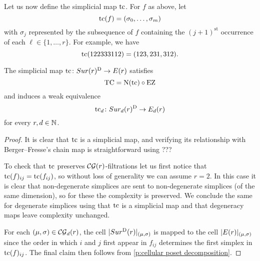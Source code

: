 Let us now define the simplicial map $\operatorname{tc}$.
For $f$ as above, let
\[
\operatorname{tc}(f) = (\sigma_0,\dots,\sigma_m)
\]
with $\sigma_j$ represented by the subsequence of $f$ containing the $(j+1)^{\mathrm{st}}$ occurrence of each $\ell \in \{1,\dots,r\}$.
For example, we have
\[
\operatorname{tc}(122333112) = (123,231,312).
\]

\begin{theorem}
	The simplicial map $\operatorname{tc} \colon Sur(r)^{\mathrm{D}} \to E(r)$ satisfies
	\[
	\operatorname{TC} = \operatorname{N}(\operatorname{tc}) \circ \operatorname{EZ}
	\]
	and induces a weak equivalence
	\[
	\operatorname{tc}_d \colon Sur_d(r)^{\mathrm{D}} \to E_d(r)
	\]
	for every $r,d \in \mathbb{N}$.
\end{theorem}

\begin{proof}
	It is clear that $\operatorname{tc}$ is a simplicial map, and verifying its relationship with Berger--Fresse's chain map is straightforward using ???

	To check that $\operatorname{tc}$ preserves $\mathcal{CG}(r)$-filtrations let us first notice that $\operatorname{tc}(f)_{ij} = \operatorname{tc}(f_{ij})$, so without loss of generality we can assume $r=2$.
	In this case it is clear that non-degenerate simplices are sent to non-degenerate simplices (of the same dimension), so for these the complexity is preserved.
	We conclude the same for degenerate simplices using that $\operatorname{tc}$ is a simplicial map and that degeneracy maps leave complexity unchanged.

	For each $(\mu,\sigma) \in \mathcal{CG}_d(r)$, the cell $\lvert Sur^{\mathrm{D}}(r)\rvert_{(\mu,\sigma)}$ is mapped to the cell $\lvert E(r)\rvert_{(\mu,\sigma)}$ since the order in which $i$ and $j$ first appear in $f_{ij}$ determines the first simplex in $\operatorname{tc}(f)_{ij}$.
	The final claim then follows from \cref{p:cellular poset decomposition}.
\end{proof}